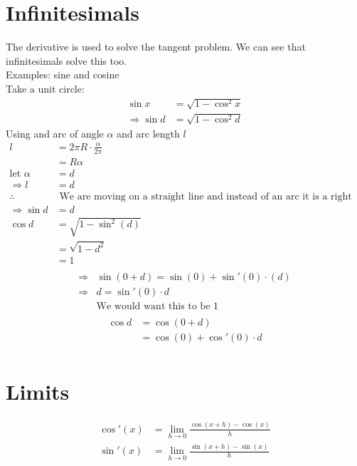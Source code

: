 \documentclass[a4paper,12pt]{article}
\begin{document}
\section*{Infinitesimals}
The derivative is used to solve the tangent problem. We can see that infinitesimals solve this too. \\
Examples: sine and cosine \\
Take a unit circle:
\begin{align*}
\sin x & = \sqrt{1-\cos^2x} \\
\Rightarrow \sin d & = \sqrt{1-\cos^2d}
\end{align*}
Using and arc of angle $\alpha$ and arc length $l$
\begin{align*}
l & = 2 \pi R \cdot \frac{\alpha}{2 \pi} \\
& = R \alpha \\
\text{let } \alpha &= d \\
\Rightarrow l &= d \\
\therefore & \text{ We are moving on a straight line and instead of an arc it is a right angled triangle} \\
\Rightarrow \sin{d} & = d \\
\cos{d} & = \sqrt{1-\sin^2(d)} \\
& = \sqrt{1-d^2} \\
& = 1 \\
\end{align*}
\begin{align*}
\Rightarrow & \sin(0+d) = \sin(0) + \sin'(0) \cdot (d) \\
\Rightarrow & d = \sin'(0) \cdot d \\
&\text{We would want this to be 1} \\
\end{align*}
\begin{align*}
\cos{d} & = \cos(0+d) \\
& = \cos(0) + \cos'(0) \cdot d \\
\end{align*}
\section*{Limits}
\begin{align*}
\cos'(x) & = \lim_{h \to 0} \frac{\cos(x+h) - \cos(x)}{h} \\
\sin'(x) & = \lim_{h \to 0} \frac{\sin(x+h) - \sin(x)}{h} \\
\end{align*}
\end{document}
